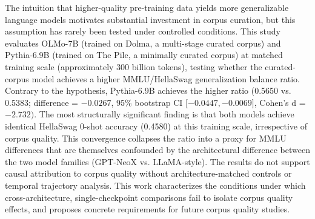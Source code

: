 
The intuition that higher-quality pre-training data yields more generalizable language models motivates substantial investment in corpus curation, but this assumption has rarely been tested under controlled conditions. This study evaluates OLMo-7B (trained on Dolma, a multi-stage curated corpus) and Pythia-6.9B (trained on The Pile, a minimally curated corpus) at matched training scale (approximately 300 billion tokens), testing whether the curated-corpus model achieves a higher MMLU/HellaSwag generalization balance ratio. Contrary to the hypothesis, Pythia-6.9B achieves the higher ratio (0.5650 vs. 0.5383; difference = $-0.0267$, 95\% bootstrap CI [$-0.0447, -0.0069]$, Cohen's d = $-2.732)$. The most structurally significant finding is that both models achieve identical HellaSwag 0-shot accuracy (0.4580) at this training scale, irrespective of corpus quality. This convergence collapses the ratio into a proxy for MMLU differences that are themselves confounded by the architectural difference between the two model families (GPT-NeoX vs. LLaMA-style). The results do not support causal attribution to corpus quality without architecture-matched controls or temporal trajectory analysis. This work characterizes the conditions under which cross-architecture, single-checkpoint comparisons fail to isolate corpus quality effects, and proposes concrete requirements for future corpus quality studies.

